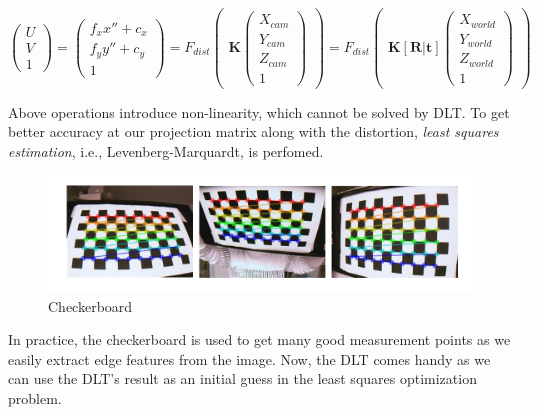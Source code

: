 \documentclass[a4paper]{report}
\numberwithin{figure}{section}
\begin{document}
\begin{equation}
  \begin{pmatrix}
    U\\
    V\\
    1
  \end{pmatrix}
  =
  \begin{pmatrix}
    f_x x'' + c_x\\
    f_y y'' + c_y\\
    1
  \end{pmatrix}
    =
    F_{dist}\begin{pmatrix}
      \mathbf{K}
      \begin{pmatrix}
        X_{cam}\\
        Y_{cam}\\
        Z_{cam}\\
        1
      \end{pmatrix}
    \end{pmatrix} 
    =
    F_{dist}\begin{pmatrix}
      \mathbf{K} [\mathbf{R}|\mathbf{t}]
      \begin{pmatrix}
        X_{world}\\
        Y_{world}\\
        Z_{world}\\
        1
      \end{pmatrix}
    \end{pmatrix}
\end{equation} \label{eq:proj_func_w_f_c}

Above operations introduce non-linearity, which cannot be solved by DLT.
To get better accuracy at our projection matrix along with the distortion, 
\textit{least squares estimation}, i.e., Levenberg-Marquardt, is perfomed.

\begin{figure}[H]
	\centering
  \includegraphics[width=\linewidth,natwidth=640,natheight=640]
  {fig/ref_imgs/checkerboard.png}
  \caption{Checkerboard}
  \label{fig:checkerboard}
\end{figure}

In practice, the checkerboard is used to get many good measurement points 
as  we easily extract edge features from the image. Now, the DLT comes handy
as we can use the DLT's result as an initial guess 
in the least squares optimization problem.
\end{document}
